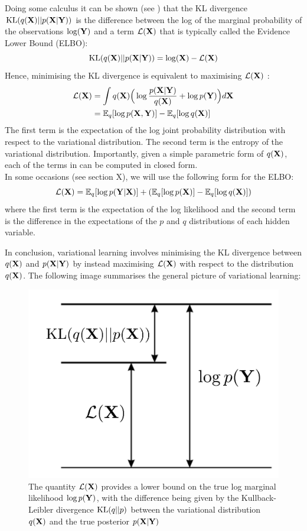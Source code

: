 Doing some calculus it can be shown (see \cite{Bishop,Murphy}) that the KL divergence ${\rm KL}(q({\bf X})||p({\bf X}|{\bf Y}))$ is the difference between the log of the marginal probability of the observations $\log({\bf Y})$ and a term $\mathcal{L}({\bf X})$ that is typically called the Evidence Lower Bound (ELBO):
\[
	{\rm KL}(q({\bf X})||p({\bf X}|{\bf Y})) = \log({\bf X}) - \mathcal{L}({\bf X})
\]
Hence, minimising the KL divergence is equivalent to maximising $\mathcal{L}({\bf X})$ :
\begin{align} \label{eq_elbo1} \begin{split}
	\mathcal{L}({\bf X}) &= \int q({\bf X}) \Big( \log \frac{p({\bf X}|{\bf Y})}{q({\bf X})} + \log p({\bf Y}) \Big) d{\bf X} \\
	&= \mathbb{E}_q [\log p({\bf X},{\bf Y})] - \mathbb{E}_q [\log q({\bf X})]
\end{split} \end{align}
The first term is the expectation of the log joint probability distribution with respect to the variational distribution. The second term is the entropy of the variational distribution.
Importantly, given a simple parametric form of $q({\bf X})$, each of the terms in  can be computed in closed form.\\
In some occasions (see section X), we will use the following form for the ELBO:
\begin{equation} \label{eq_elbo2}
	\mathcal{L}({\bf X}) = \mathbb{E}_q [\log p({\bf Y}|{\bf X})] + (\mathbb{E}_q [\log p({\bf X})] - \mathbb{E}_q [\log q({\bf X})])
\end{equation}
where the first term is the expectation of the log likelihood and the second term is the difference in the expectations of the $p$ and $q$ distributions of each hidden variable.

In conclusion, variational learning involves minimising the KL divergence between $q({\bf X})$ and $p({\bf X}|{\bf Y})$ by instead maximising $\mathcal{L}({\bf X})$ with respect to the distribution $q({\bf X})$. The following image summarises the general picture of variational learning:

\begin{figure}[H]
	\centering
	\includegraphics[width=0.35\linewidth]{lower_bound}
	\caption{The quantity $\mathcal{L}({\bf X})$ provides a lower bound on the true log marginal likelihood $\log p({\bf Y})$, with the difference being given by the Kullback-Leibler divergence ${\rm KL}(q||p)$ between the variational distribution $q({\bf X})$ and the true posterior $p({\bf X}|{\bf Y})$}
	\label{fig:ELBO}
\end{figure}

